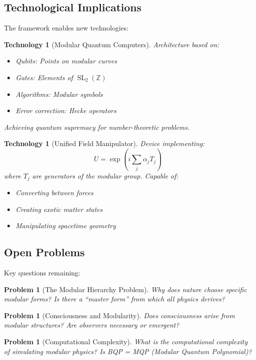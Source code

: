 \documentclass[12pt,a4paper]{article}
\newtheorem{technology}[theorem]{Technology}
\newtheorem{problem}[theorem]{Problem}
\DeclareMathOperator{\SL}{SL}
\begin{document}
\subsection{Technological Implications}

The framework enables new technologies:

\begin{technology}[Modular Quantum Computers]
Architecture based on:
\begin{itemize}
\item Qubits: Points on modular curves
\item Gates: Elements of $\SL_2(\mathbb{Z})$
\item Algorithms: Modular symbols
\item Error correction: Hecke operators
\end{itemize}
Achieving quantum supremacy for number-theoretic problems.
\end{technology}

\begin{technology}[Unified Field Manipulator]
Device implementing:
\[
U = \exp\left(i \sum_j \alpha_j T_j\right)
\]
where $T_j$ are generators of the modular group. Capable of:
\begin{itemize}
\item Converting between forces
\item Creating exotic matter states
\item Manipulating spacetime geometry
\end{itemize}
\end{technology}

\subsection{Open Problems}

Key questions remaining:

\begin{problem}[The Modular Hierarchy Problem]
Why does nature choose specific modular forms? Is there a ``master form'' from which all physics derives?
\end{problem}

\begin{problem}[Consciousness and Modularity]
Does consciousness arise from modular structures? Are observers necessary or emergent?
\end{problem}

\begin{problem}[Computational Complexity]
What is the computational complexity of simulating modular physics? Is BQP = MQP (Modular Quantum Polynomial)?
\end{problem}
\end{document}
